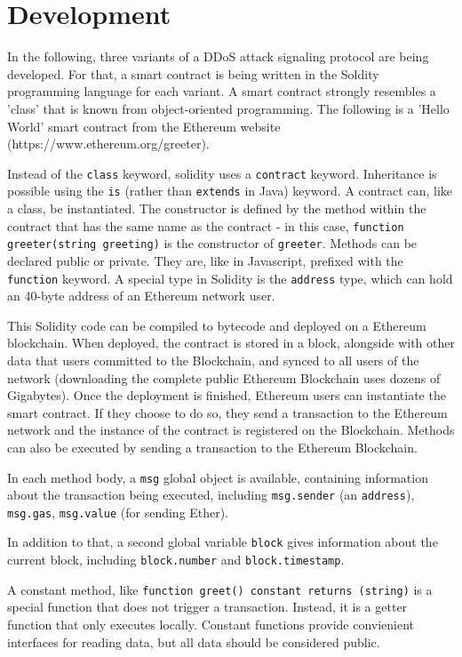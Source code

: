 \chapter{Development}

In the following, three variants of a DDoS attack signaling protocol are being developed. For that, a smart contract is being written in the Soldity programming language \cite{Solc} for each variant. A smart contract strongly resembles a 'class' that is known from object-oriented programming. The following is a 'Hello World' smart contract from the Ethereum website (https://www.ethereum.org/greeter).



Instead of the \texttt{class} keyword, solidity uses a \texttt{contract} keyword. Inheritance is possible using the \texttt{is} (rather than \texttt{extends} in Java) keyword. A contract can, like a class, be instantiated. The constructor is defined by the method within the contract that has the same name as the contract - in this case, \texttt{function greeter(string greeting)} is the constructor of \texttt{greeter}. Methods can be declared public or private. They are, like in Javascript, prefixed with the \texttt{function} keyword. A special type in Solidity is the \texttt{address} type, which can hold an 40-byte address of an Ethereum network user.

This Solidity code can be compiled to bytecode and deployed on a Ethereum blockchain. When deployed, the contract is stored in a block, alongside with other data that users committed to the Blockchain, and synced to all users of the network (downloading the complete public Ethereum Blockchain uses dozens of Gigabytes). Once the deployment is finished, Ethereum users can instantiate the smart contract. If they choose to do so, they  send a transaction to the Ethereum network and the instance of the contract is registered on the Blockchain. Methods can also be executed by sending a transaction to the Ethereum Blockchain.

In each method body, a \texttt{msg} global object is available, containing information about the transaction being executed, including \texttt{msg.sender} (an \texttt{address}), \texttt{msg.gas}, \texttt{msg.value} (for sending Ether).

In addition to that, a second global variable \texttt{block} gives information about the current block, including \texttt{block.number} and \texttt{block.timestamp}.

A constant method, like \texttt{function greet() constant returns (string)} is a special function that does not trigger a transaction. Instead, it is a getter function that only executes locally. Constant functions provide convienient interfaces for reading data, but all data should be considered public.

